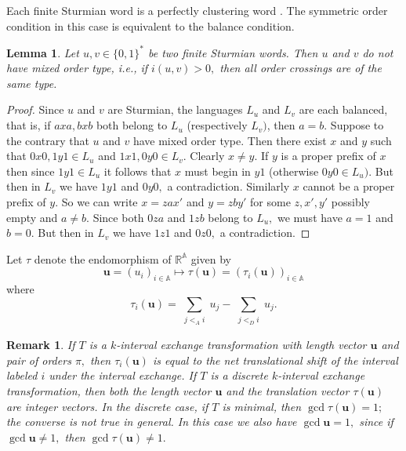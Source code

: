 \documentclass[12pt,a4paper]{amsart}
\newcommand{\reals}{{\mathbb R}}
\newcommand{\A}{{\mathbb A}}
\newtheorem{lemma}{Lemma}
\newtheorem{remark}{Remark}
\begin{document}
Each finite Sturmian word is a perfectly clustering word \cite{mrs}. The symmetric order condition in this case is equivalent to the balance condition. 
 
\begin{lemma}\label{sturm1}Let $u,v \in \{0,1\}^*$ be two finite Sturmian words.  Then $u$ and $v$ do not have mixed order type, i.e., if $i(u,v)>0,$ then all order crossings are of the same type.\end{lemma}

\begin{proof} Since $u$ and $v$ are Sturmian, the languages $L_u$ and $L_v$ are each balanced, that is, if $axa, bxb $ both belong to $L_u$ (respectively $L_v)$,  then $a=b.$ Suppose to the contrary that $u$ and $v$ have mixed order type. Then there exist $x$ and $y$ such that $0x0, 1y1 \in L_u$ and $1x1, 0y0 \in L_v.$ Clearly $x\neq y.$ If $y$ is a proper prefix of $x$ then since $1y1\in L_u$ it follows that $x$ must begin in $y1$ (otherwise $0y0\in L_u).$  But then in $L_v$ we have $1y1$ and $0y0,$ a contradiction. Similarly $x$ cannot be a proper prefix of $y.$ So we can write $x=zax'$ and $y=zby'$ for some $z, x', y'$ possibly empty and $a\neq b.$ Since both $0za$ and $1zb$ belong to $L_u,$  we must have $a=1$ and $b=0. $ But then in $L_v$ we have $1z1$ and $0z0,$ a contradiction.  
\end{proof}  


Let    $\tau$ denote the endomorphism of  $\reals^{\A}$  given by 
\[ \mathbf u=(u_i)_{i\in \A} \mapsto \tau (\mathbf u)=(\tau_i(\mathbf u))_{i\in \A}\] where 
\[\tau_i(\mathbf u)=\sum_{\substack{j<_A i}}u_j
        -\sum_{\substack{j<_D i}}u_j.\]
        
 \begin{remark}\label{gcd}\rm  If $T$ is a $k$-interval exchange transformation with length vector  $\mathbf u$  and pair of orders $\pi,$ then  $\tau_i(\mathbf u)$ is equal to the net translational shift of the interval labeled $i$ under the interval exchange. If $T$ is a discrete $k$-interval exchange transformation, then both the length vector $\mathbf u$   and the translation vector $\tau (\mathbf u)$ are integer vectors. In the discrete case, if $T$ is minimal, then $\gcd \tau (\mathbf u)=1;$ the converse is not true in general. In this case we also have  $\gcd \mathbf u =1,$ since if  $\gcd \mathbf u \neq 1,$ then $\gcd \tau (\mathbf u)\neq 1.$%
 \end{remark}       
\end{document}
